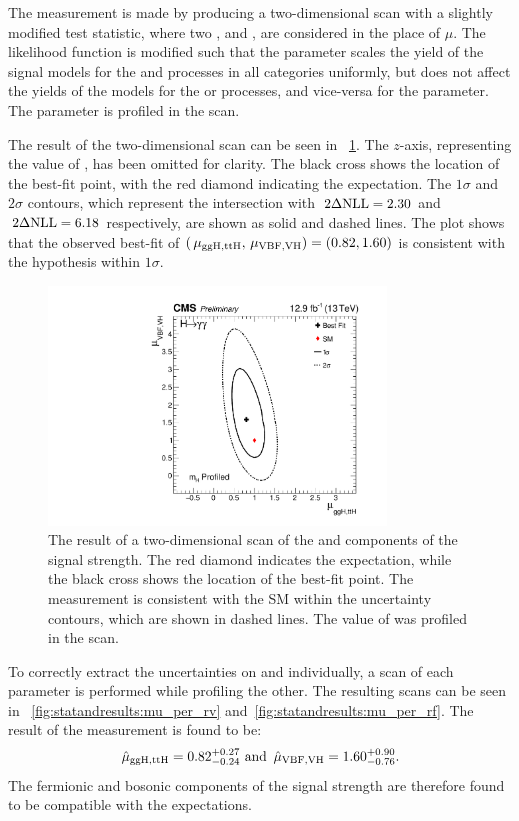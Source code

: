 The measurement is made by producing a two-dimensional \DNLL scan with a slightly modified test statistic, where two \POI\s, \muF and \muV, are considered in the place of $\mu$. The likelihood function is modified such that the \muF parameter scales the yield of the signal models for the \ggH and \ttH processes in all categories uniformly, but does not affect the yields of the models for the \VBF or \VH processes, and vice-versa for the \muV parameter. The \mH parameter is profiled in the scan.

The result of the two-dimensional scan can be seen in \Fig~\ref{fig:statandresults:mu_per_rvrf}. The $z$-axis, representing the value of \DNLL, has been omitted for clarity.  The black cross shows the location of the best-fit point, with the red diamond indicating the \SM expectation. The $1\sigma$ and $2\sigma$ contours, which represent the intersection with $\,2\Delta\text{NLL}=2.30$ and $\,2\Delta\text{NLL}=6.18$ respectively, are shown as solid and dashed lines. The plot shows that the observed best-fit of $(\,\mu_{\text{ggH},\text{ttH}} ,\,\mu_{\text{VBF},\text{VH}} )=(0.82,1.60)$ is consistent with the \SM hypothesis within $1\sigma$.
\begin{figure}[ht!]
\centering
\includegraphics[width=0.8\textwidth]{statandresultsFigures/RVRFScanProfileMH.pdf} 
\caption{The result of a two-dimensional \DNLL scan of the \muF and \muV components of the signal strength. The red diamond indicates the \SM expectation, while the black cross shows the location of the best-fit point. The measurement is consistent with the SM within the uncertainty contours, which are shown in dashed lines. The value of \mH was profiled in the scan.}

\label{fig:statandresults:mu_per_rvrf}
\end{figure}

To correctly extract the uncertainties on \muF and \muV individually, a \DNLL scan of each parameter is performed while profiling the other. The resulting scans can be seen in \Fig\s~\ref{fig:statandresults:mu_per_rv} and~\ref{fig:statandresults:mu_per_rf}. The result of the measurement is found to be:
\begin{equation*}
\,\hat{\mu}_{\text{ggH},\text{ttH}}=0.82^{+0.27}_{-0.24} \text{ and } \,\hat{\mu}_{\text{VBF},\text{VH}}=1.60^{+0.90}_{-0.76}. 
\end{equation*}
The fermionic and bosonic components of the signal strength are therefore found to be compatible with the \SM expectations. 

